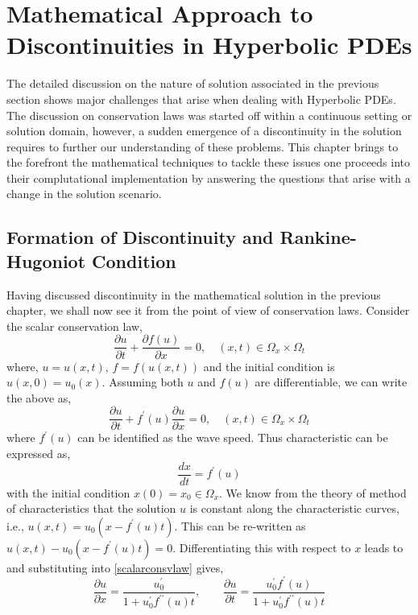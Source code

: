 \documentclass[11pt, a4paper]{report}
\begin{document}
\chapter{Mathematical Approach to Discontinuities in Hyperbolic PDEs}
The detailed discussion on the nature of solution associated in the previous section shows major challenges 
that arise when dealing with Hyperbolic PDEs. The discussion on conservation laws was started off within a 
continuous setting or solution domain, however, a sudden emergence of a discontinuity in the solution requires
to further our understanding of these problems. This chapter brings to the forefront the mathematical techniques
to tackle these issues one proceeds into their complutational implementation by answering the questions that 
arise with a change in the solution scenario. 

\section{Formation of Discontinuity and Rankine-Hugoniot Condition}
Having discussed discontinuity in the mathematical solution in the previous chapter, we shall now see it from
the point of view of conservation laws. Consider the scalar conservation law,
\begin{equation} \label{scalarconsvlaw}
    \frac{\partial u}{\partial t} + \frac{\partial f(u)}{\partial x} = 0, \quad (x, t)\in\Omega_{x}\times\Omega_{t}
\end{equation}
where, $u = u(x, t)$, $f = f(u(x,t))$ and the initial condition is $u(x, 0) = u_0(x)$. Assuming both $u$ and
$f(u)$ are differentiable, we can write the above as,
\begin{equation*}
    \frac{\partial u}{\partial t} + f^{\prime}(u)\frac{\partial u}{\partial x} = 0, \quad (x, t)\in\Omega_{x}\times\Omega_{t}
\end{equation*}
where $f^{\prime}(u)$ can be identified as the wave speed. Thus characteristic can be expressed as,
\begin{equation*}
    \frac{dx}{dt} = f^{\prime}(u)
\end{equation*}
with the initial condition $x(0) = x_0 \in \Omega_x$. We know from the theory of method of characteristics that
the solution $u$ is constant along the characteristic curves, i.e., $u(x, t) = u_0(x-f^{\prime}(u)t)$. This can 
be re-written as $u(x, t) - u_0(x-f^{\prime}(u)t) = 0$. Differentiating this with respect to $x$ leads to and
substituting into \eqref{scalarconsvlaw} gives,
\begin{equation*}
    \frac{\partial u}{\partial x} = \frac{u_{0}^{\prime}}{1 + u_{0}^{\prime}f^{\prime\prime}(u)t}, \qquad
    \frac{\partial u}{\partial t} = \frac{u_{0}^{\prime}f^{\prime}(u)}{1 + u_{0}^{\prime}f^{\prime\prime}(u)t}
\end{equation*}
\end{document}
